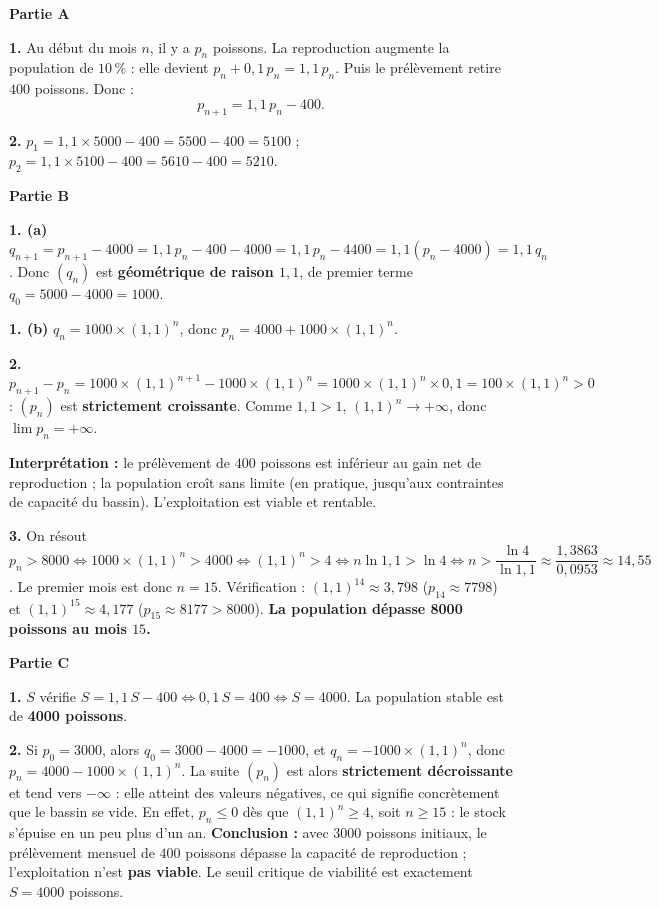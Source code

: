 \documentclass[11pt]{article}
\begin{document}
\begin{corrige}
\textbf{Partie A}

\textbf{1.} Au début du mois $n$, il y a $p_n$ poissons. La reproduction augmente la population de $10\,\%$ : elle devient $p_n + 0{,}1\,p_n = 1{,}1\,p_n$. Puis le prélèvement retire $400$ poissons. Donc :
\[ p_{n+1} = 1{,}1\,p_n - 400. \]

\textbf{2.} $p_1 = 1{,}1 \times 5000 - 400 = 5500 - 400 = 5100$ ; \quad $p_2 = 1{,}1 \times 5100 - 400 = 5610 - 400 = 5210$.

\textbf{Partie B}

\textbf{1. (a)} $q_{n+1} = p_{n+1} - 4000 = 1{,}1\,p_n - 400 - 4000 = 1{,}1\,p_n - 4400 = 1{,}1(p_n - 4000) = 1{,}1\,q_n$. Donc $(q_n)$ est \textbf{géométrique de raison $1{,}1$}, de premier terme $q_0 = 5000 - 4000 = 1000$.

\textbf{1. (b)} $q_n = 1000 \times (1{,}1)^n$, donc $p_n = 4000 + 1000 \times (1{,}1)^n$.

\textbf{2.} $p_{n+1} - p_n = 1000 \times (1{,}1)^{n+1} - 1000 \times (1{,}1)^n = 1000 \times (1{,}1)^n \times 0{,}1 = 100 \times (1{,}1)^n > 0$ : $(p_n)$ est \textbf{strictement croissante}. Comme $1{,}1 > 1$, $(1{,}1)^n \to +\infty$, donc $\lim p_n = +\infty$.

\textbf{Interprétation :} le prélèvement de $400$ poissons est inférieur au gain net de reproduction ; la population croît sans limite (en pratique, jusqu'aux contraintes de capacité du bassin). L'exploitation est viable et rentable.

\textbf{3.} On résout $p_n > 8000 \iff 1000 \times (1{,}1)^n > 4000 \iff (1{,}1)^n > 4 \iff n \ln 1{,}1 > \ln 4 \iff n > \dfrac{\ln 4}{\ln 1{,}1} \approx \dfrac{1{,}3863}{0{,}0953} \approx 14{,}55$. Le premier mois est donc $n = 15$. Vérification : $(1{,}1)^{14} \approx 3{,}798$ ($p_{14} \approx 7798$) et $(1{,}1)^{15} \approx 4{,}177$ ($p_{15} \approx 8177 > 8000$). \textbf{La population dépasse \num{8000} poissons au mois $15$.}

\textbf{Partie C}

\textbf{1.} $S$ vérifie $S = 1{,}1\,S - 400 \iff 0{,}1\,S = 400 \iff S = 4000$. La population stable est de \textbf{\num{4000} poissons}.

\textbf{2.} Si $p_0 = 3000$, alors $q_0 = 3000 - 4000 = -1000$, et $q_n = -1000 \times (1{,}1)^n$, donc $p_n = 4000 - 1000 \times (1{,}1)^n$. La suite $(p_n)$ est alors \textbf{strictement décroissante} et tend vers $-\infty$ : elle atteint des valeurs négatives, ce qui signifie concrètement que le bassin se vide. En effet, $p_n \leq 0$ dès que $(1{,}1)^n \geq 4$, soit $n \geq 15$ : le stock s'épuise en un peu plus d'un an. \textbf{Conclusion :} avec \num{3000} poissons initiaux, le prélèvement mensuel de $400$ poissons dépasse la capacité de reproduction ; l'exploitation n'est \textbf{pas viable}. Le seuil critique de viabilité est exactement $S = \num{4000}$ poissons.


\end{corrige}
\end{document}
